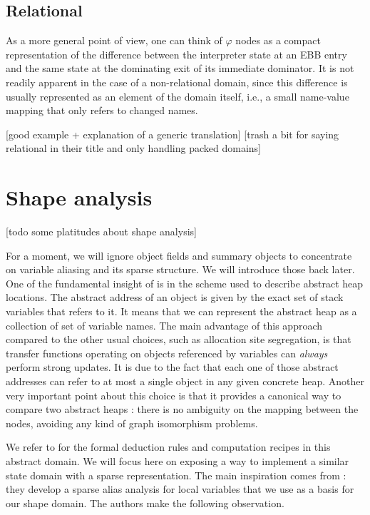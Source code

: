 \documentclass[11pt]{article}
\renewcommand{\phi}{\varphi}
\begin{document}
\subsection*{Relational}

As a more general point of view, one can think of $\phi$ nodes as a compact representation of the difference between the interpreter state at an EBB entry and the same state at the dominating exit of its immediate dominator.
It is not readily apparent in the case of a non-relational domain, since this difference is usually represented as an element of the domain itself, i.e., a small name-value mapping that only refers to changed names.

[good example + explanation of a generic translation]
[trash a bit \cite{sparse-nr} for saying relational in their title and only handling packed domains]

\section*{Shape analysis}

[todo some platitudes about shape analysis]

For a moment, we will ignore object fields and summary objects to concentrate on variable aliasing and its sparse structure. We will introduce those back later.
One of the fundamental insight of \cite{ssc} is in the scheme used to describe abstract heap locations.
The abstract address of an object is given by the exact set of stack variables that refers to it.
It means that we can represent the abstract heap as a collection of set of variable names.
The main advantage of this approach compared to the other usual choices, such as allocation site segregation, is that transfer functions operating on objects referenced by variables can \emph{always} perform strong updates.
It is due to the fact that each one of those abstract addresses can refer to at most a single object in any given concrete heap.
Another very important point about this choice is that it provides a canonical way to compare two abstract heaps : there is no ambiguity on the mapping between the nodes, avoiding any kind of graph isomorphism problems.

We refer to \cite{ssc} for the formal deduction rules and computation recipes in this abstract domain.
We will focus here on exposing a way to implement a similar state domain with a sparse representation.
The main inspiration comes from \cite{ssa-alias}: they develop a sparse alias analysis for local variables that we use as a basis for our shape domain. The authors make the following observation.
\end{document}
